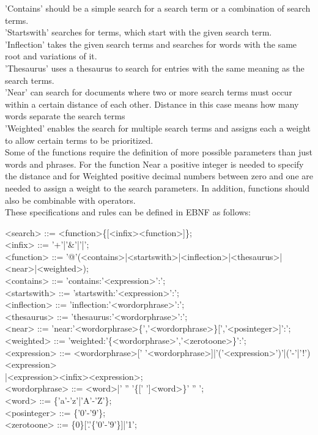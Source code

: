 'Contains' should be a simple search for a search term or a combination of search terms.\\
'Startswith' searches for terms, which start with the given search term.\\
'Inflection' takes the given search terms and searches for words with the same root and variations of it.\\
'Thesaurus' uses a thesaurus to search for entries with the same meaning as the search terms.\\
'Near' can search for documents where two or more search terms must occur within a certain distance of each other. Distance in this case means how many words separate the search terms\\
'Weighted' enables the search for multiple search terms and assigns each a weight to allow certain terms to be prioritized.\\
Some of the functions require the definition of more possible parameters than just words and phrases. For the function Near a positive integer is needed to specify the distance and for Weighted positive decimal numbers between zero and one are needed to assign a weight to the search parameters. In addition, functions should also be combinable with operators.\\
These specifications and rules can be defined in \ac{EBNF} as follows:
\begin{grammar}
    <search> ::= <function>\{[<infix><function>]\}; \\
    <infix> ::= '+'|'\&'|'|'; \\
    <function> ::= '@'(<contains>|<startswith>|<inflection>|<thesaurus>|<near>|<weighted>); \\

    <contains> ::= 'contains:'<expression>':'; \\
    <startswith> ::= 'startswith:'<expression>':'; \\
    <inflection> ::= 'inflection:'<wordorphrase>':'; \\
    <thesaurus> ::= 'thesaurus:'<wordorphrase>':'; \\
    <near> ::= 'near:'<wordorphrase>\{','<wordorphrase>\}[','<posinteger>]':'; \\
    <weighted> ::= 'weighted:'\{<wordorphrase>','<zerotoone>\}':'; \\

    <expression> ::= <wordorphrase>[' '<wordorphrase>]|'('<expression>')'|('-'|'!')<expression>\\
    \hspace*{\fill}|<expression><infix><expression>; \\
    <wordorphrase> ::= <word>|' '' '\{[' ']<word>\}' '' '; \\
    <word> ::= \{'a'-'z'|'A'-'Z'\}; \\
    <posinteger> ::= \{'0'-'9'\}; \\
    <zerotoone> ::= \{0\}['.'\{'0'-'9'\}]|'1';
\end{grammar}